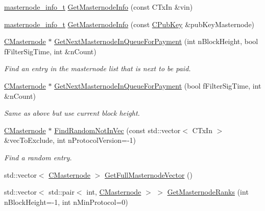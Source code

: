\begin{DoxyCompactItemize}
\item 
\mbox{\hyperlink{structmasternode__info__t}{masternode\+\_\+info\+\_\+t}} \mbox{\hyperlink{class_c_masternode_man_a7623608ee2bd62f3ef63d7c0f503e881}{Get\+Masternode\+Info}} (const C\+Tx\+In \&vin)
\item 
\mbox{\hyperlink{structmasternode__info__t}{masternode\+\_\+info\+\_\+t}} \mbox{\hyperlink{class_c_masternode_man_a46247936554d84ce942c384c80f74e35}{Get\+Masternode\+Info}} (const \mbox{\hyperlink{class_c_pub_key}{C\+Pub\+Key}} \&pub\+Key\+Masternode)
\item 
\mbox{\hyperlink{class_c_masternode}{C\+Masternode}} $\ast$ \mbox{\hyperlink{class_c_masternode_man_af90f3376d7f264536207b08e2fc395d8}{Get\+Next\+Masternode\+In\+Queue\+For\+Payment}} (int n\+Block\+Height, bool f\+Filter\+Sig\+Time, int \&n\+Count)
\begin{DoxyCompactList}\small\item\em Find an entry in the masternode list that is next to be paid. \end{DoxyCompactList}\item 
\mbox{\hyperlink{class_c_masternode}{C\+Masternode}} $\ast$ \mbox{\hyperlink{class_c_masternode_man_ae1426198b7debf7f22d228e6fe9edbc3}{Get\+Next\+Masternode\+In\+Queue\+For\+Payment}} (bool f\+Filter\+Sig\+Time, int \&n\+Count)
\begin{DoxyCompactList}\small\item\em Same as above but use current block height. \end{DoxyCompactList}\item 
\mbox{\hyperlink{class_c_masternode}{C\+Masternode}} $\ast$ \mbox{\hyperlink{class_c_masternode_man_ab09f6565943d5c40492d260af29100cd}{Find\+Random\+Not\+In\+Vec}} (const std\+::vector$<$ C\+Tx\+In $>$ \&vec\+To\+Exclude, int n\+Protocol\+Version=-\/1)
\begin{DoxyCompactList}\small\item\em Find a random entry. \end{DoxyCompactList}\item 
std\+::vector$<$ \mbox{\hyperlink{class_c_masternode}{C\+Masternode}} $>$ \mbox{\hyperlink{class_c_masternode_man_ab39e213a7601e1bef2eba1d5d63206f5}{Get\+Full\+Masternode\+Vector}} ()
\item 
std\+::vector$<$ std\+::pair$<$ int, \mbox{\hyperlink{class_c_masternode}{C\+Masternode}} $>$ $>$ \mbox{\hyperlink{class_c_masternode_man_adb8c916326fe125f9749c8f68bcd9a17}{Get\+Masternode\+Ranks}} (int n\+Block\+Height=-\/1, int n\+Min\+Protocol=0)

\end{DoxyCompactItemize}
